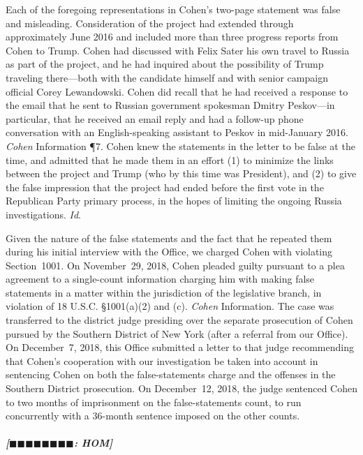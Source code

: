Each of the foregoing representations in Cohen's two-page statement was false and misleading.
Consideration of the project had extended through approximately June 2016 and included more than three progress reports from Cohen to Trump.
Cohen had discussed with Felix Sater his own travel to Russia as part of the project, and he had inquired about the possibility of Trump traveling there---both with the candidate himself and with senior campaign official Corey Lewandowski.
Cohen did recall that he had received a response to the email that he sent to Russian government spokesman Dmitry Peskov---in particular, that he received an email reply and had a follow-up phone conversation with an English-speaking assistant to Peskov in mid-January 2016.
\textit{Cohen} Information \P 7.
Cohen knew the statements in the letter to be false at the time, and admitted that he made them in an effort (1) to minimize the links between the project and Trump (who by this time was President), and (2) to give the false impression that the project had ended before the first vote in the Republican Party primary process, in the hopes of limiting the ongoing Russia investigations.
\textit{Id}.

Given the nature of the false statements and the fact that he repeated them during his initial interview with the Office, we charged Cohen with violating Section~1001.
On November~29, 2018, Cohen pleaded guilty pursuant to a plea agreement to a single-count information charging him with making false statements in a matter within the jurisdiction of the legislative branch, in violation of 18 U.S.C. \S 1001(a)(2) and (c).
\textit{Cohen} Information.
The case was transferred to the district judge presiding over the separate prosecution of Cohen pursued by the Southern District of New York (after a referral from our Office).
On December~7, 2018, this Office submitted a letter to that judge recommending that Cohen's cooperation with our investigation be taken into account in sentencing Cohen on both the false-statements charge and the offenses in the Southern District prosecution.
On December~12, 2018, the judge sentenced Cohen to two months of imprisonment on the false-statements count, to run concurrently with a 36-month sentence imposed on the other counts.

\subparagraph{[$\blacksquare\blacksquare\blacksquare\blacksquare\blacksquare\blacksquare\blacksquare\blacksquare$: HOM]}


